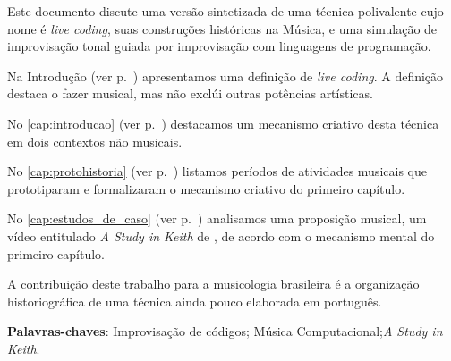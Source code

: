 
\setlength{\absparsep}{18pt} %
\begin{resumo}

Este documento discute uma versão sintetizada de uma técnica polivalente cujo nome é \emph{live coding}, suas construções históricas na Música, e uma simulação de improvisação tonal guiada por improvisação com linguagens de programação.

Na Introdução (ver p.~\pageref{cap:intro}) apresentamos uma definição de \emph{live coding}. A definição destaca o fazer musical, mas não exclúi outras potências artísticas. 

No \autoref{cap:introducao} (ver p.~\pageref{cap:introducao}) destacamos um mecanismo criativo desta técnica em dois contextos não musicais.

No \autoref{cap:protohistoria} (ver p.~\pageref{cap:protohistoria}) listamos  períodos de atividades musicais que prototiparam e formalizaram o mecanismo criativo do primeiro capítulo.

No \autoref{cap:estudos_de_caso} (ver p.~\pageref{cap:estudos_de_caso}) analisamos uma proposição musical, 
um vídeo entitulado \emph{A Study in Keith} de , de acordo com o mecanismo mental do primeiro capítulo.

A contribuição deste trabalho para a musicologia brasileira é a organização historiográfica de uma técnica ainda pouco elaborada em português.

\vspace{\onelineskip}
\noindent
\textbf{Palavras-chaves}: Improvisação de códigos; Música Computacional;\emph{A Study in Keith}.
\end{resumo}


